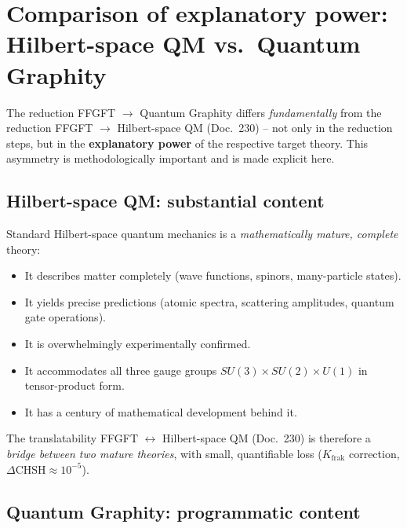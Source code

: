 \section{Comparison of explanatory power: Hilbert-space QM vs.\ Quantum Graphity}

The reduction FFGFT $\to$ Quantum Graphity differs \emph{fundamentally}
from the reduction FFGFT $\to$ Hilbert-space QM (Doc.~230) -- not only
in the reduction steps, but in the \textbf{explanatory power} of the
respective target theory. This asymmetry is methodologically
important and is made explicit here.

\subsection{Hilbert-space QM: substantial content}

Standard Hilbert-space quantum mechanics is a \emph{mathematically
mature, complete} theory:
\begin{itemize}[leftmargin=2em,itemsep=2pt,topsep=2pt]
  \item It describes matter completely (wave functions, spinors,
        many-particle states).
  \item It yields precise predictions (atomic spectra, scattering
        amplitudes, quantum gate operations).
  \item It is overwhelmingly experimentally confirmed.
  \item It accommodates all three gauge groups
        $SU(3) \times SU(2) \times U(1)$ in tensor-product form.
  \item It has a century of mathematical development behind it.
\end{itemize}

The translatability FFGFT $\leftrightarrow$ Hilbert-space QM
(Doc.~230) is therefore a \emph{bridge between two mature theories},
with small, quantifiable loss ($K_{\text{frak}}$ correction,
$\Delta\text{CHSH} \approx 10^{-5}$).

\subsection{Quantum Graphity: programmatic content}

